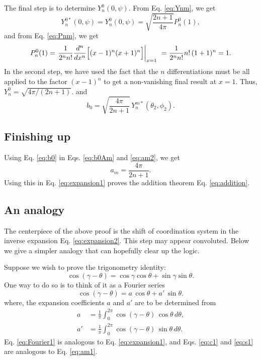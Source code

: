 \documentclass[11pt]{article}
\begin{document}
The final step is to determine $Y_n^0(0, \psi)$.
From Eq. \eqref{eq:Ynm}, we get
\[
  Y_n^{0*}(0, \psi)
=
  Y_n^0(0, \psi)
=
  \sqrt{
    \frac { 2 n + 1 } { 4 \pi }
  }
  P_{n}^0(1),
\]
and
from Eq. \eqref{eq:Pnm}, we get
\[
  P_{n}^{0}(1)
=
  \left.
  \frac{ 1 } { 2^{n} n! }
  \frac{ d^{n} } { d x^{n} }
  \Bigl[
    (x - 1)^{n}
    (x + 1)^{n}
  \Bigr]
  \right|_{x = 1}\
= \frac{ 1 } { 2^{n} n! }
  n! \, (1 + 1)^n
= 1.
\]
In the second step,
we have used the fact that
the $n$ differentiations must be
all applied to the factor $(x - 1)^n$
to get a non-vanishing final result at $x = 1$.
%
Thus,
$Y_n^0 = \sqrt{4\pi/(2n+1)}$.
and
\begin{equation}
b_0 = \sqrt{ \frac {4 \pi} { 2 n + 1 } } \, Y_n^{m*}(\theta_2, \phi_2).
\label{eq:b0}
\end{equation}



\subsection{Finishing up}



Using Eq. \eqref{eq:b0} in Eqs. \eqref{eq:b0Am} and \eqref{eq:am2},
we get
\begin{equation}
  a_m = \frac{ 4 \pi } { 2 n + 1 }.
\end{equation}
Using this in Eq. \eqref{eq:expansion1}
proves the addition theorem Eq. \eqref{eq:addition}.




\subsection{An analogy}



The centerpiece of the above proof is the shift of coordination system
in the inverse expansion Eq. \eqref{eq:expansion2}.
This step may appear convoluted.
Below we give a simpler analogy
that can hopefully clear up the logic.

Suppose we wish to prove the trigonometry identity:
\begin{equation}
  \cos(\gamma - \theta)
= \cos\gamma \cos\theta
+ \sin\gamma \sin\theta.
\label{eq:cosab}
\end{equation}
One way to do so is to think of it as a Fourier series
\begin{equation}
  \cos(\gamma - \theta)
=
  a \, \cos\theta
+
  a' \, \sin\theta.
  \label{eq:Fourier1}
\end{equation}
where, the expansion coefficients $a$ and $a'$
are to be determined from
\begin{align}
a &= \frac{1}{\pi} \int_0^{2\pi}
  \cos(\gamma - \theta) \, \cos\theta \, d\theta,
  \label{eq:c1}
\\
a' &= \frac{1}{\pi} \int_0^{2\pi}
  \cos(\gamma - \theta) \, \sin\theta \, d\theta.
  \label{eq:s1}
\end{align}
Eq. \eqref{eq:Fourier1} is analogous to Eq. \eqref{eq:expansion1},
and Eqs. \eqref{eq:c1} and \eqref{eq:s1}
are analogous to Eq. \eqref{eq:am1}.
\end{document}
